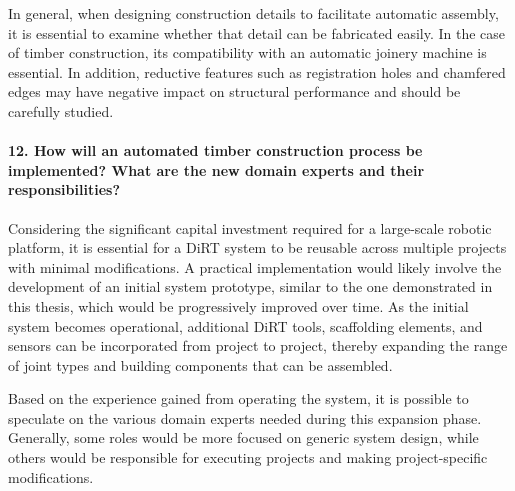 In general, when designing construction details to facilitate automatic assembly, it is essential to examine whether that detail can be fabricated easily. In the case of timber construction, its compatibility with an automatic joinery machine is essential. In addition, reductive features such as registration holes and chamfered edges may have negative impact on structural performance and should be carefully studied.

\paragraph{12. How will an automated timber construction process be implemented? What are the new domain experts and their responsibilities?}


Considering the significant capital investment required for a large-scale robotic platform, it is essential for a DiRT system to be reusable across multiple projects with minimal modifications. A practical implementation would likely involve the development of an initial system prototype, similar to the one demonstrated in this thesis, which would be progressively improved over time. As the initial system becomes operational, additional DiRT tools, scaffolding elements, and sensors can be incorporated from project to project, thereby expanding the range of joint types and building components that can be assembled.

Based on the experience gained from operating the system, it is possible to speculate on the various domain experts needed during this expansion phase. Generally, some roles would be more focused on generic system design, while others would be responsible for executing projects and making project-specific modifications.

